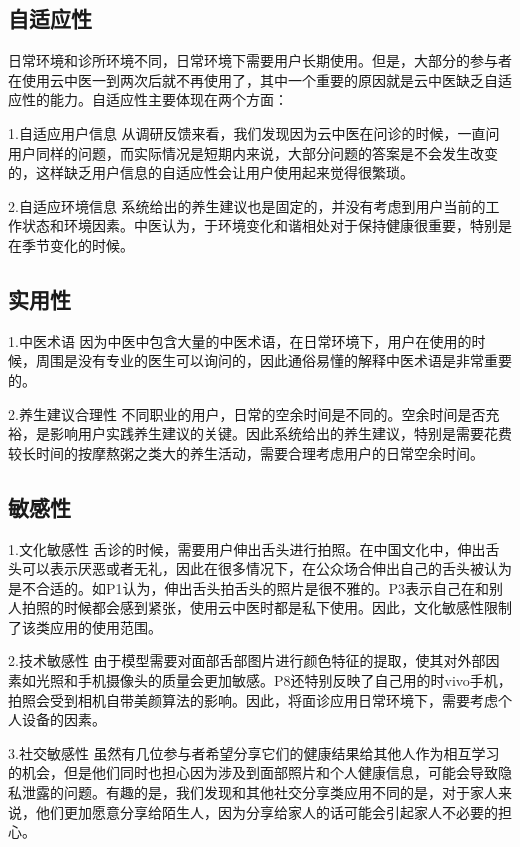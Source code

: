 \subsection{自适应性}
日常环境和诊所环境不同，日常环境下需要用户长期使用。但是，大部分的参与者在使用云中医一到两次后就不再使用了，其中一个重要的原因就是云中医缺乏自适应性的能力。自适应性主要体现在两个方面：

1.自适应用户信息
从调研反馈来看，我们发现因为云中医在问诊的时候，一直问用户同样的问题，而实际情况是短期内来说，大部分问题的答案是不会发生改变的，这样缺乏用户信息的自适应性会让用户使用起来觉得很繁琐。

2.自适应环境信息
系统给出的养生建议也是固定的，并没有考虑到用户当前的工作状态和环境因素。中医认为，于环境变化和谐相处对于保持健康很重要，特别是在季节变化的时候。
\subsection{实用性}
1.中医术语
 因为中医中包含大量的中医术语，在日常环境下，用户在使用的时候，周围是没有专业的医生可以询问的，因此通俗易懂的解释中医术语是非常重要的。
 
2.养生建议合理性
不同职业的用户，日常的空余时间是不同的。空余时间是否充裕，是影响用户实践养生建议的关键。因此系统给出的养生建议，特别是需要花费较长时间的按摩熬粥之类大的养生活动，需要合理考虑用户的日常空余时间。
\subsection{敏感性}
1.文化敏感性
舌诊的时候，需要用户伸出舌头进行拍照。在中国文化中，伸出舌头可以表示厌恶或者无礼，因此在很多情况下，在公众场合伸出自己的舌头被认为是不合适的。如P1认为，伸出舌头拍舌头的照片是很不雅的。P3表示自己在和别人拍照的时候都会感到紧张，使用云中医时都是私下使用。因此，文化敏感性限制了该类应用的使用范围。

2.技术敏感性
由于模型需要对面部舌部图片进行颜色特征的提取，使其对外部因素如光照和手机摄像头的质量会更加敏感。P8还特别反映了自己用的时vivo手机，拍照会受到相机自带美颜算法的影响。因此，将面诊应用日常环境下，需要考虑个人设备的因素。

3.社交敏感性
虽然有几位参与者希望分享它们的健康结果给其他人作为相互学习的机会，但是他们同时也担心因为涉及到面部照片和个人健康信息，可能会导致隐私泄露的问题。有趣的是，我们发现和其他社交分享类应用不同的是，对于家人来说，他们更加愿意分享给陌生人，因为分享给家人的话可能会引起家人不必要的担心。
